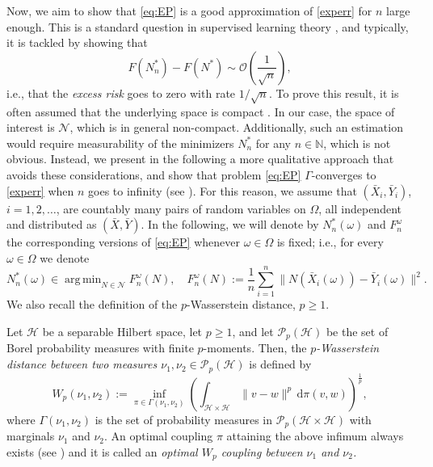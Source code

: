 \documentclass[onefignum,onetabnum]{siamonline250211}
\newcommand{\N}{\mathcal{N}}
\DeclareMathOperator*{\argmin}{arg\,min}
\begin{document}
Now, we aim to show that \cref{eq:EP} is a good approximation of \cref{experr} for $n$ large enough. This is a standard question in supervised learning theory \cite{cusma}, and typically, it is tackled by showing that
$$
F(N^*_n)-F(N^*)\sim \mathcal{O}\left(\frac{1}{\sqrt{n}}\right),
$$
i.e., that the \emph{excess risk} goes to zero with rate $1/\sqrt{n}$. To prove this result, it is often assumed that the underlying space is compact \cite[Theorem C]{cusma}. In our case, the space of interest is $\N$, which is in general non-compact. Additionally, such an estimation would require measurability of the minimizers $N^*_n$ for any $n\in\mathbb{N}$, which is not obvious. Instead, we present in the following a more qualitative approach that avoids these considerations, and show that problem \cref{eq:EP}  $\Gamma$-converges to \cref{experr} when $n$ goes to infinity (see \cite{braides}). For this reason, we assume that $(\bar{X}_i, \bar{Y}_i)$, $i=1, 2,\ldots$, are countably many pairs of random variables on $\Omega$, all independent and distributed as $(\bar{X}, \bar{Y})$. In the following, we will denote by $N^*_n(\omega)$ and $F_n^\omega$ the corresponding versions of \cref{eq:EP} whenever $\omega\in \Omega$ is fixed; i.e., for every $\omega\in \Omega$ we denote
\begin{equation}\label{eq:Fn_sampled}
N^*_n(\omega)\in \argmin_{N\in\N}F_n^\omega(N), \quad F_n^\omega(N):=\frac{1}{n}\sum_{i=1}^n \|N(\bar{X}_i(\omega))-\bar{Y}_i(\omega)\|^2.
\end{equation}
We also recall the definition of the $p$-Wasserstein distance, $p\geq 1$.
\begin{definition}
    Let $\mathcal{H}$ be a separable Hilbert space, let $p\geq 1$, and let $\mathcal{P}_p(\mathcal{H})$ be the set of Borel probability measures with finite $p$-moments. Then, the \emph{$p$-Wasserstein distance between two measures $\nu_1,\nu_2\in\mathcal{P}_p(\mathcal{H})$} is defined by
    \begin{equation}\label{eq:ot}
    W_p(\nu_1,\nu_2) := \inf_{\pi \in \Gamma(\nu_1,\nu_2)} \left(\int_{\mathcal{H}\times \mathcal{H}} \|v-w\|^p \, \mathrm{d}\pi(v,w)\right)^{\frac{1}{p}},
    \end{equation}
    where $\Gamma(\nu_1,\nu_2)$ is the set of probability measures in $\mathcal{P}_p(\mathcal{H}\times \mathcal{H})$ with marginals $\nu_1$ and $\nu_2$. An optimal coupling $\pi$ attaining the above infimum always exists (see \cite[Theorem 4.1]{Villani2009}) and it is called an \emph{optimal $W_p$ coupling between $\nu_1$ and $\nu_2$.}
\end{definition}
\end{document}
